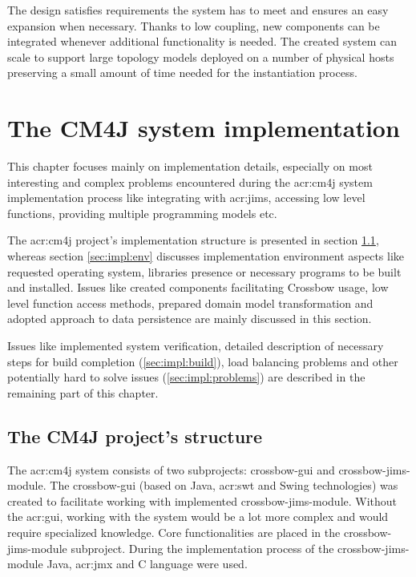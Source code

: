 \documentclass[11pt,openany]{book}
\begin{document}
      The design satisfies requirements the system has to meet and ensures an easy expansion when necessary. Thanks to
      low coupling, new components can be integrated whenever additional functionality is needed. The created system can
      scale to support large topology models deployed on a number of physical hosts preserving a small amount of time
      needed for the instantiation process.


  \chapter{The CM4J system implementation}
  \label{chap:impl}

    This chapter focuses mainly on implementation details, especially on most interesting and complex problems
    encountered during the \gls{acr:cm4j} system implementation process like integrating with \gls{acr:jims}, accessing
    low level functions, providing multiple programming models etc.

    The \gls{acr:cm4j} project's implementation structure is presented in section \ref{sec:impl:structure}, whereas
    section \ref{sec:impl:env} discusses implementation environment aspects like requested operating system, libraries
    presence or necessary programs to be built and installed. Issues like created components facilitating Crossbow
    usage, low level function access methods, prepared domain model transformation and adopted approach to data
    persistence are mainly discussed in this section.

    Issues like implemented system verification, detailed description of necessary steps for build completion
    (\ref{sec:impl:build}), load balancing problems and other potentially hard to solve issues (\ref{sec:impl:problems})
    are described in the remaining part of this chapter.


    \section{The CM4J project's structure}
    \label{sec:impl:structure}

      The \gls{acr:cm4j} system consists of two subprojects: crossbow-gui and crossbow-jims-module. The crossbow-gui
      (based on Java, \gls{acr:swt} and Swing technologies) was created to facilitate working with implemented
      crossbow-jims-module. Without the \gls{acr:gui}, working with the system would be a lot more complex and would
      require specialized knowledge. Core functionalities are placed in the crossbow-jims-module subproject. During the
      implementation process of the crossbow-jims-module Java, \gls{acr:jmx} and C language were used.
\end{document}
